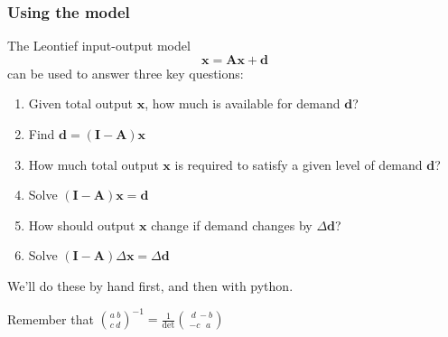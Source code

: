 \documentclass[dvips, %
               xcolor=pst,
               hyperref={colorlinks=false,
               dvips,
               citecolor=magenta,menucolor=cyan,
               bookmarks,bookmarksopen,pdfpagemode=UseThumbs}
              ]{beamer}
\renewcommand{\red}{}
\begin{document}
\begin{frame}[fragile]\frametitle{Using the model}
The Leontief input-output model 
\[
\boldsymbol{x} = \boldsymbol{A}\boldsymbol{x}+\boldsymbol{d}
\]
can be used to answer three key questions:

\pause
\begin{enumerate}[<+->]

\item
Given total output $\boldsymbol{x}$, how much is available for demand $\boldsymbol{d}$?

\item[\ ]{\red Find  $\boldsymbol{d} = (\boldsymbol{I}-\boldsymbol{A})\boldsymbol{x}$}

\item
How much total output $\boldsymbol{x}$ is required to satisfy a given level of
demand $\boldsymbol{d}$?

\item[\ ]{\red Solve  $(\boldsymbol{I}-\boldsymbol{A})\boldsymbol{x} = \boldsymbol{d}$}

\item
How should output $\boldsymbol{x}$ change if demand changes by $\Delta\boldsymbol{d}$?

\item[\ ]{\red Solve  $(\boldsymbol{I}-\boldsymbol{A})\Delta\boldsymbol{x} = \Delta\boldsymbol{d}$}

\end{enumerate}

\pause
We'll do these by hand first, and then with python.

\pause
Remember that
${a\ b\choose c\ d}^{-1} = \frac{1}{\mathrm{det}}{\ \ d\ -b\choose -c\ \ \ a}$

\end{frame}
\end{document}
